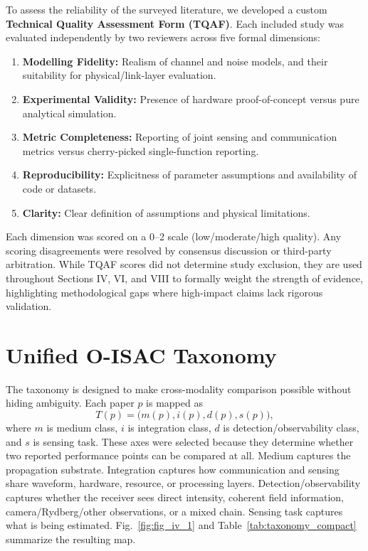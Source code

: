 \documentclass[letterpaper,journal]{IEEEtran}
\begin{document}
To assess the reliability of the surveyed literature, we developed a custom \textbf{Technical Quality Assessment Form (TQAF)}. Each included study was evaluated independently by two reviewers across five formal dimensions:
\begin{enumerate}
    \item \textbf{Modelling Fidelity:} Realism of channel and noise models, and their suitability for physical/link-layer evaluation.
    \item \textbf{Experimental Validity:} Presence of hardware proof-of-concept versus pure analytical simulation.
    \item \textbf{Metric Completeness:} Reporting of joint sensing and communication metrics versus cherry-picked single-function reporting.
    \item \textbf{Reproducibility:} Explicitness of parameter assumptions and availability of code or datasets.
    \item \textbf{Clarity:} Clear definition of assumptions and physical limitations.
\end{enumerate}

Each dimension was scored on a 0--2 scale (low/moderate/high quality). Any scoring disagreements were resolved by consensus discussion or third-party arbitration. While TQAF scores did not determine study exclusion, they are used throughout Sections IV, VI, and VIII to formally weight the strength of evidence, highlighting methodological gaps where high-impact claims lack rigorous validation.

\section{Unified O-ISAC Taxonomy}
\label{sec:taxonomy}

The taxonomy is designed to make cross-modality comparison possible without hiding ambiguity. Each paper \(p\) is mapped as
\begin{equation}
    T(p)=\bigl(m(p),i(p),d(p),s(p)\bigr),
    \label{eq:taxonomy_vector}
\end{equation}
where \(m\) is medium class, \(i\) is integration class, \(d\) is detection/observability class, and \(s\) is sensing task. These axes were selected because they determine whether two reported performance points can be compared at all. Medium captures the propagation substrate. Integration captures how communication and sensing share waveform, hardware, resource, or processing layers. Detection/observability captures whether the receiver sees direct intensity, coherent field information, camera/Rydberg/other observations, or a mixed chain. Sensing task captures what is being estimated. Fig.~\ref{fig:fig_iv_1} and Table~\ref{tab:taxonomy_compact} summarize the resulting map.
\end{document}
